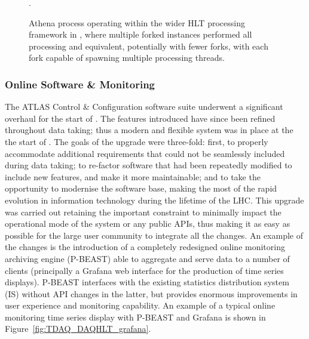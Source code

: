 \documentclass[cernpreprint, atlasdraft=false, UKenglish,british,orcidlogo, texmf, orcidlogo]{atlasdoc}
\begin{document}
\begin{figure}[htbp!]
\begin{minipage}{0.4\textwidth}
\centerline{}
\end{minipage}\hfill
\begin{minipage}{0.55\textwidth}
\centerline{}
\end{minipage}
\caption{\protect{} Athena process operating within the wider \gls{HLT} processing framework in \RunTwo, where multiple forked instances performed all processing and \protect{} \RunThr equivalent, potentially with fewer forks, with each fork capable of spawning multiple processing threads\protect\footnotemark.}.
\label{fig:TDAQ_DAQHLT_hlpu}
\end{figure}
 
 
\subsubsection{Online Software \& Monitoring}
 
The ATLAS Control \& Configuration software suite underwent a significant
overhaul for the start of \RunTwo. The features introduced have since been
refined throughout data taking; thus a modern and flexible system was in place at the
the start of \RunThr. The goals of the upgrade
were three-fold: first, to properly accommodate additional requirements that
could not be seamlessly included during data taking; to re-factor software that
had been repeatedly modified to include new features, and make it more
maintainable; and to take the opportunity to modernise the software base,
making the most of the rapid evolution in information technology during the lifetime
of the \gls{LHC}. This upgrade was carried out retaining the important constraint
to minimally impact the operational mode of the system or any public \glspl{API}, thus
making it as easy as possible for the large user community to integrate all the
changes. An example of the changes is the introduction of a completely redesigned
online monitoring archiving engine (P-BEAST) able to aggregate and serve data to
a number of clients (principally a Grafana web interface for the production
of time series displays). P-BEAST interfaces with the existing statistics distribution
system (IS) without \gls{API} changes in the latter, but provides enormous improvements
in user experience and monitoring capability. An example of a typical online monitoring
time series display with P-BEAST and Grafana is shown in Figure~\ref{fig:TDAQ_DAQHLT_grafana}.
 
\end{document}
